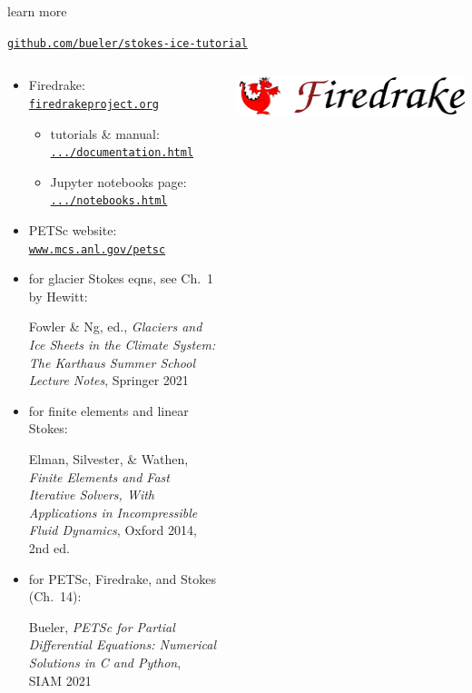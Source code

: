 \documentclass[10pt,hyperref,dvipsnames]{beamer}
\begin{document}
\begin{frame}{learn more}

\centerline{\large \href{https://github.com/bueler/stokes-ice-tutorial}{\alert{\texttt{github.com/bueler/stokes-ice-tutorial}}}}

\medskip
\hrulefill


\begin{columns}
\begin{column}{0.6\textwidth}
\small

\begin{itemize}
\item Firedrake: \href{https://www.firedrakeproject.org/}{\texttt{firedrakeproject.org}}

    \begin{itemize}
    \scriptsize
    \item tutorials \& manual: \href{https://www.firedrakeproject.org/documentation.html}{\texttt{.../documentation.html}}
    \item Jupyter notebooks page: \href{https://www.firedrakeproject.org/notebooks.html}{\texttt{.../notebooks.html}}
    \end{itemize}
\item PETSc website: \href{https://www.mcs.anl.gov/petsc/}{\texttt{www.mcs.anl.gov/petsc}}
\item for glacier Stokes eqns, see Ch.~1 by Hewitt:


{\scriptsize Fowler \& Ng, ed., \emph{Glaciers and Ice Sheets in the Climate System: The Karthaus Summer School Lecture Notes}, Springer 2021}

\item for finite elements and linear Stokes:

{\scriptsize Elman, Silvester, \& Wathen, \emph{Finite Elements and Fast Iterative Solvers, With Applications in Incompressible Fluid Dynamics}, Oxford 2014, 2nd ed.}

\item for PETSc, Firedrake, and Stokes (Ch.~14):

{\scriptsize Bueler, \emph{PETSc for Partial Differential Equations: Numerical Solutions in C and Python}, SIAM 2021}
\end{itemize}
\end{column}

\begin{column}{0.4\textwidth}

\bigskip
\href{https://www.firedrakeproject.org/}{\includegraphics[width=\textwidth]{figs/firedrakebanner.png}}


\end{column}
\end{columns}
\end{frame}
\end{document}
